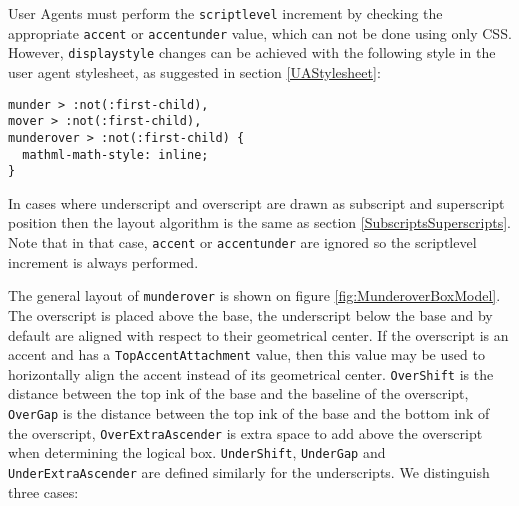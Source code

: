 User Agents must perform the {\tt scriptlevel} increment by checking
the appropriate {\tt accent} or {\tt accentunder} value, which can not be done
using only CSS. However, {\tt displaystyle} changes can be achieved with the
following style in the user agent stylesheet, as suggested in section
\ref{UAStylesheet}:
%
\begin{lstlisting}
munder > :not(:first-child),
mover > :not(:first-child),
munderover > :not(:first-child) {
  mathml-math-style: inline;
}
\end{lstlisting}
%

In cases where underscript and overscript are drawn as subscript and
superscript position then the layout algorithm is the same as section
\ref{SubscriptsSuperscripts}. Note that in that case,
{\tt accent} or {\tt accentunder} are ignored so the scriptlevel increment is
always performed.

The general layout of {\tt munderover} is shown on figure
\ref{fig:MunderoverBoxModel}.
The overscript is placed above the base, the underscript below the base
and by default are aligned with respect to their geometrical center.
If the overscript is an accent and has a {\tt TopAccentAttachment}
value, then this value may be used to horizontally align the accent instead
of its geometrical center.
{\tt OverShift} is the distance between the top ink
of the base and the baseline of the overscript, {\tt OverGap} is the distance
between the top ink of the base and the bottom ink of the overscript,
{\tt OverExtraAscender} is extra space to add above the overscript when
determining the logical box. {\tt UnderShift}, {\tt UnderGap} and
{\tt UnderExtraAscender} are defined similarly for the underscripts.
We distinguish three cases:

